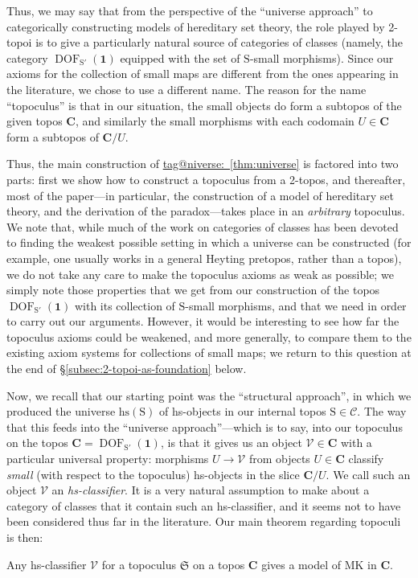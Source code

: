 \documentclass{amsart}
\makeatletter
\newcommand\bC{\mathbf{C}}
\newcommand\cC{\mathcal{C}}
\newcommand\cV{\mathcal{V}}
\newcommand\DOF{\operatorname{DOF}}
\newcommand\fS{\mathfrak{S}}
\newcommand\hs{\mathrm{hs}}
\newcommand\rS{\mathrm{S}}
\newcommand\tm{\mathbf{1}}
\newcommand\prooflabel[1]{\gdef\proof@label{#1}}
\def\proof@label{}
\newcommand\tagword[1]{\csname tag@#1\endcsname}
\def\label@tag#1:#2\@nil{#1}
\newcommand\labeltag[1]{\label@tag#1:\@nil}
\newcommand\jref[1]{%
  \texorpdfstring%
    {\hyperref[#1]{\tagword{\labeltag{#1}}~\ref*{#1}}}%
    {\tagword{\labeltag{#1}}~\ref*{#1}}%
}
\newcommand\prerefpost[3]{%
  \texorpdfstring%
    {\hyperref[#2]{#1\ref*{#2}#3}}%
    {#1\ref*{#2}#3}%
}
\newcommand\sref[1]{\prerefpost{\S}{#1}{}}
\theoremstyle{definition}
\theoremstyle{remark}
\theoremstyle{plainwithref}
\makeatother
\begin{document}
Thus, we may say that from the perspective of the ``universe approach'' to categorically constructing models of hereditary set theory, the role played by 2-topoi is to give a particularly natural source of categories of classes (namely, the category \( \DOF_{\rS'}(\tm) \) equipped with the set of \( \rS \)-small morphisms).
Since our axioms for the collection of small maps are different from the ones appearing in the literature, we chose to use a different name.
The reason for the name ``topoculus'' is that in our situation, the small objects do form a subtopos of the given topos \( \bC \), and similarly the small morphisms with each codomain \( U \in \bC \) form a subtopos of \( \bC / U \).

Thus, the main construction of \jref{thm:universe} is factored into two parts: first we show how to construct a topoculus from a 2-topos, and thereafter, most of the paper---in particular, the construction of a model of hereditary set theory, and the derivation of the paradox---takes place in an \emph{arbitrary} topoculus.
We note that, while much of the work on categories of classes has been devoted to finding the weakest possible setting in which a universe can be constructed (for example, one usually works in a general Heyting pretopos, rather than a topos), we do not take any care to make the topoculus axioms as weak as possible; we simply note those properties that we get from our construction of the topos \( \DOF_{\rS'}(\tm) \) with its collection of \( \rS \)-small morphisms, and that we need in order to carry out our arguments.
However, it would be interesting to see how far the topoculus axioms could be weakened, and more generally, to compare them to the existing axiom systems for collections of small maps; we return to this question at the end of \sref{subsec:2-topoi-as-foundation} below.

Now, we recall that our starting point was the ``structural approach'', in which we produced the universe \( \hs(\rS) \) of hs-objects in our internal topos \( \rS \in \cC \).
The way that this feeds into the ``universe approach''---which is to say, into our topoculus on the topos \( \bC = \DOF_{\rS'}(\tm) \), is that it gives us an object \( \cV \in \bC \) with a particular universal property: morphisms \( U \to \cV \) from objects \( U \in \bC \) classify \emph{small} (with respect to the topoculus) hs-objects in the slice \( \bC / U \).
We call such an object \( \cV \) an \emph{hs-classifier}.
It is a very natural assumption to make about a category of classes that it contain such an hs-classifier, and it seems not to have been considered thus far in the literature.
Our main theorem regarding topoculi is then:
{
  \prooflabel{thm:model-of-mk}
  \renewcommand{\thedefn}{~\ref*{thm:model-of-mk}}
  \begin{thm}
    Any hs-classifier \( \cV \) for a topoculus \( \fS \) on a topos \( \bC \) gives a model of MK in \( \bC \).
  \end{thm}
}
\end{document}
